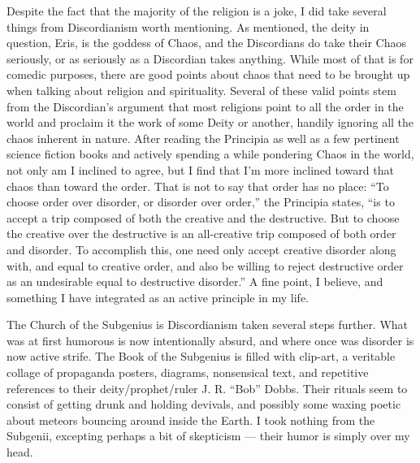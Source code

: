 Despite the fact that the majority of the religion is a joke, I did take several things from Discordianism worth mentioning. As mentioned, the deity in question, Eris, is the goddess of Chaos, and the Discordians do take their Chaos seriously, or as seriously as a Discordian takes anything. While most of that is for comedic purposes, there are good points about chaos that need to be brought up when talking about religion and spirituality. Several of these valid points stem from the Discordian's argument that most religions point to all the order in the world and proclaim it the work of some Deity or another, handily ignoring all the chaos inherent in nature. After reading the Principia as well as a few pertinent science fiction books and actively spending a while pondering Chaos in the world, not only am I inclined to agree, but I find that I'm more inclined toward that chaos than toward the order. That is not to say that order has no place: ``To choose order over disorder, or disorder over order,'' the Principia states, ``is to accept a trip composed of both the creative and the destructive. But to choose the creative over the destructive is an all-creative trip composed of both order and disorder. To accomplish this, one need only accept creative disorder along with, and equal to creative order, and also be willing to reject destructive order as an undesirable equal to destructive disorder.'' A fine point, I believe, and something I have integrated as an active principle in my life.

The Church of the Subgenius is Discordianism taken several steps further. What was at first humorous is now intentionally absurd, and where once was disorder is now active strife. The Book of the Subgenius is filled with clip-art, a veritable collage of propaganda posters, diagrams, nonsensical text, and repetitive references to their deity/prophet/ruler J. R. ``Bob'' Dobbs. Their rituals seem to consist of getting drunk and holding devivals, and possibly some waxing poetic about meteors bouncing around inside the Earth. I took nothing from the Subgenii, excepting perhaps a bit of skepticism --- their humor is simply over my head.

